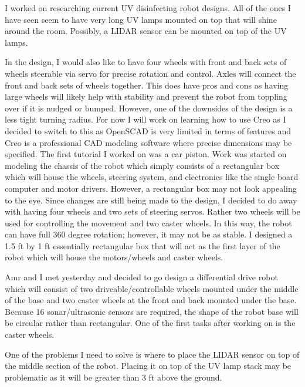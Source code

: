 \documentclass[fontsize=11pt, %
                             paper=a4, %
                             twoside, %
                             captions=tableheading,
                             index=totoc,
                             hyperref]{labbook}
\begin{document}
\begin{addmargin}[0cm]{0cm}
I worked on researching current UV disinfecting robot designs. All of the ones I have seen seem to have very long UV lamps mounted on top that will shine around the room. Possibly, a LIDAR sensor can be mounted on top of the UV lamps.

In the design, I would also like to have four wheels with front and back sets of wheels steerable via servo for precise rotation and control. Axles will connect the front and back sets of wheels together. This does have pros and cons as having large wheels will likely help with stability and prevent the robot from toppling over if it is nudged or bumped. However, one of the downsides of the design is a less tight turning radius. For now I will work on learning how to use Creo as I decided to switch to this as OpenSCAD is very limited in terms of features and Creo is a professional CAD modeling software where precise dimensions may be specified. The first tutorial I worked on was a car piston. Work was started on modeling the chassis of the robot which simply consists of a rectangular box which will house the wheels, steering system, and electronics like the single board computer and motor drivers. However, a rectangular box may not look appealing to the eye. Since changes are still being made to the design, I decided to do away with having four wheels and two sets of steering servos. Rather two wheels will be used for controlling the movement and two caster wheels. In this way, the robot can have full 360 degree rotation; however, it may not be as stable. I designed a 1.5 ft by 1 ft essentially rectangular box that will act as the first layer of the robot which will house the motors/wheels and caster wheels.

Amr and I met yesterday and decided to go design a differential drive robot which will consist of two driveable/controllable wheels mounted under the middle of the base and two caster wheels at the front and back mounted under the base. Because 16 sonar/ultrasonic sensors are required, the shape of the robot base will be circular rather than rectangular. One of the first tasks after working on is the caster wheels. 

One of the problems I need to solve is where to place the LIDAR sensor on top of the middle section of the robot. Placing it on top of the UV lamp stack may be problematic as it will be greater than 3 ft above the ground.


\end{addmargin}
\end{document}
